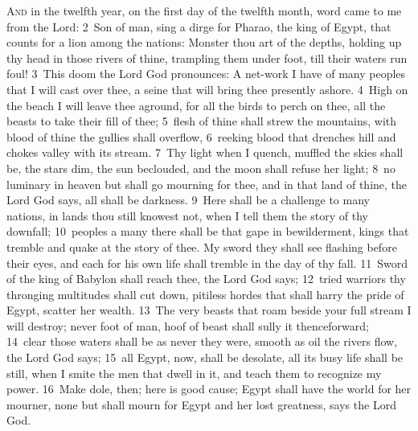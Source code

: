 \documentclass[10pt]{book} %
\begin{document}
\lettrine[lines=2]{A}{nd} in the twelfth year, on the first day of the twelfth month, word came to me from the Lord: \textcolor{benred8}{2}~Son of man, sing a dirge for Pharao, the king of Egypt, that counts for a lion among the nations: Monster thou art of the depths, holding up thy head in those rivers of thine, trampling them under foot, till their waters run foul! \textcolor{benred8}{3}~This doom the Lord God pronounces: A net-work I have of many peoples that I will cast over thee, a seine that will bring thee presently ashore. \textcolor{benred8}{4}~High on the beach I will leave thee aground, for all the birds to perch on thee, all the beasts to take their fill of thee; \textcolor{benred8}{5}~flesh of thine shall strew the mountains, with blood of thine the gullies shall overflow, \textcolor{benred8}{6}~reeking blood that drenches hill and chokes valley with its stream.
\textcolor{benred8}{7}~Thy light when I quench, muffled the skies shall be, the stars dim, the sun beclouded, and the moon shall refuse her light; \textcolor{benred8}{8}~no luminary in heaven but shall go mourning for thee, and in that land of thine, the Lord God says, all shall be darkness.
\textcolor{benred8}{9}~Here shall be a challenge to many nations, in lands thou still knowest not, when I tell them the story of thy downfall; \textcolor{benred8}{10}~peoples a many there shall be that gape in bewilderment, kings that tremble and quake at the story of thee. My sword they shall see flashing before their eyes, and each for his own life shall tremble in the day of thy fall. \textcolor{benred8}{11}~Sword of the king of Babylon shall reach thee, the Lord God says; \textcolor{benred8}{12}~tried warriors thy thronging multitudes shall cut down, pitiless hordes that shall harry the pride of Egypt, scatter her wealth. \textcolor{benred8}{13}~The very beasts that roam beside your full stream I will destroy; never foot of man, hoof of beast shall sully it thenceforward; \textcolor{benred8}{14}~clear those waters shall be as never they were, smooth as oil the river\textquotesingle s flow, the Lord God says; \textcolor{benred8}{15}~all Egypt, now, shall be desolate, all its busy life shall be still, when I smite the men that dwell in it, and teach them to recognize my power. \textcolor{benred8}{16}~Make dole, then; here is good cause; Egypt shall have the world for her mourner, none but shall mourn for Egypt and her lost greatness, says the Lord God.
\end{document}
